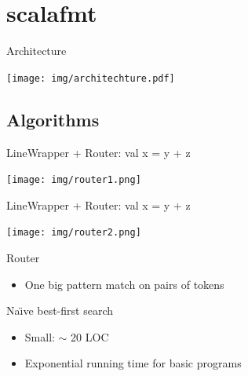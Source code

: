 \documentclass[xcolor=dvipsnames]{beamer}
\theoremstyle{definition}
\begin{document}
\section{scalafmt} %
\label{sec:scalafmt}

\begin{frame}{Architecture}
  \begin{center}
    \texttt{[image: img/architechture.pdf]}
  \end{center}
\end{frame}


%
%   
%
%   
%
\subsection{Algorithms} %

\begin{frame}{LineWrapper + Router: val x = y + z}
  \begin{center}
    \texttt{[image: img/router1.png]}
  \end{center}
\end{frame}

\begin{frame}{LineWrapper + Router: val x = y + z}
  \begin{center}
    \texttt{[image: img/router2.png]}
  \end{center}
\end{frame}

\begin{frame}{Router}
  \begin{itemize}
    \item One big pattern match on pairs of tokens
  \end{itemize}
  
\end{frame}

\newcommand{\naive}{Na\"{\i}ve}

\begin{frame}{\naive{} best-first search}
  \begin{itemize}
    \item Small: $\sim$ 20 LOC
    \item Exponential running time for basic programs
  \end{itemize}
\end{frame}
\end{document}

